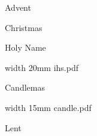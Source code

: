 \eject


\beginpart Advent



\paginaproxima


\bigskip


\paginaproxima

\beginpart Christmas


\paginaproxima


\paginaproxima


\paginaproxima

\beginpart Holy Name


\bigskip



\saveimageresource width 20mm {ihs.pdf}

\centerline{\useimageresource \lastsavedimageresourceindex}



\eject


\bigskip

\bigskip



\eject

\beginpart Candlemas


\bigskip

\saveimageresource width 15mm {candle.pdf}

\centerline{\useimageresource \lastsavedimageresourceindex}




\bigskip

\eject

\beginpart Lent


